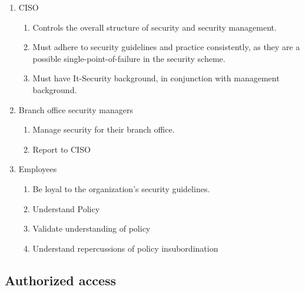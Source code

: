 \begin{enumerate}
  \item CISO 
  \begin{enumerate}
    \item Controls the overall structure of security and security management.
    \item Must adhere to security guidelines and practice consistently, as they are a possible single-point-of-failure in the security scheme.
    \item Must have It-Security background, in conjunction with management background.
  \end{enumerate}
  \item Branch office security managers
  \begin{enumerate}
     \item Manage security for their branch office.
     \item Report to CISO
  \end{enumerate}
  \item Employees
  \begin{enumerate}
    \item Be loyal to the organization's security guidelines.
    \item Understand Policy
    \item Validate understanding of policy
    \item Understand repercussions of policy insubordination
  \end{enumerate}
\end{enumerate}

\subsection{Authorized access}

